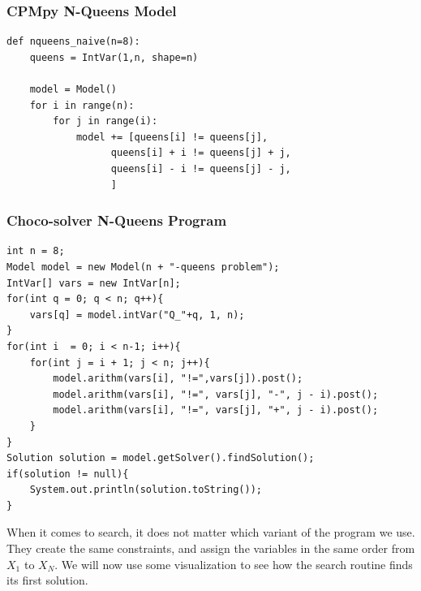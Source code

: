 \begin{frame}[fragile]
\frametitle{CPMpy N-Queens Model}
\label{nqueens:cpmpy}
\tiny
\begin{verbatim}
def nqueens_naive(n=8):
    queens = IntVar(1,n, shape=n)

    model = Model()
    for i in range(n):
        for j in range(i):
            model += [queens[i] != queens[j],
                  queens[i] + i != queens[j] + j,
                  queens[i] - i != queens[j] - j,
                  ]            
\end{verbatim}
\hyperlink{nqueens:continue}{}
\end{frame}


\begin{frame}[fragile]
\frametitle{Choco-solver N-Queens Program}
\tiny
\label{nqueens:choco}
\begin{verbatim}
int n = 8;
Model model = new Model(n + "-queens problem");
IntVar[] vars = new IntVar[n];
for(int q = 0; q < n; q++){
    vars[q] = model.intVar("Q_"+q, 1, n);
}
for(int i  = 0; i < n-1; i++){
    for(int j = i + 1; j < n; j++){
        model.arithm(vars[i], "!=",vars[j]).post();
        model.arithm(vars[i], "!=", vars[j], "-", j - i).post();
        model.arithm(vars[i], "!=", vars[j], "+", j - i).post();
    }
}
Solution solution = model.getSolver().findSolution();
if(solution != null){
    System.out.println(solution.toString());
}
\end{verbatim}
\hyperlink{nqueens:continue}{}
\end{frame}



When it comes to search, it does not matter which variant of the program we use. They create the same constraints, and assign the variables in the same order from $X_1$ to $X_N$. We will now use some visualization to see how the search routine finds its first solution.
 
